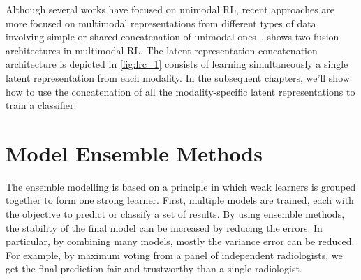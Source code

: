 \hspace*{3.5mm} Although several works have focused on unimodal RL, recent approaches are more focused on multimodal representations from different types of data involving simple or shared concatenation of unimodal ones~\cite{mmsurvey}.  shows two fusion architectures in multimodal RL. The latent representation concatenation architecture is depicted in \cref{fig:lrc_1} consists of learning simultaneously a single latent representation from each modality. In the subsequent chapters, we'll show how to use the concatenation of all the modality-specific latent representations to train a classifier. 

\section{Model Ensemble Methods}
The ensemble modelling is based on a principle in which weak learners is grouped together to form one strong learner. First, multiple models are trained, each with the objective to predict or classify a set of results. By using ensemble methods, the stability of the final model can be increased by reducing the errors. In particular, by combining many models, mostly the variance error can be reduced. For example, by maximum voting from a panel of independent radiologists, we get the final prediction fair and trustworthy than a single radiologist. 

